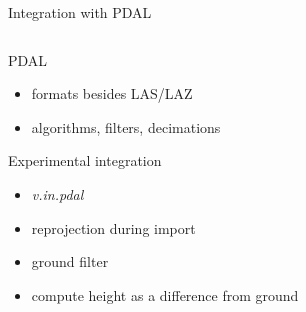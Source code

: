\documentclass[xcolor={dvipsnames,usenames},beamer,aspectratio=169]{beamer}
\newcommand{\module}[1]{\emph{#1}}
\begin{document}
\begin{frame}{Integration with PDAL}

\begin{columns}
\begin{column}{0.5\textwidth}

\begin{block}{PDAL}
 \begin{itemize}
  \item formats besides LAS/LAZ
  \item algorithms, filters, decimations
 \end{itemize}
\end{block}

\begin{block}{Experimental integration}
 \begin{itemize}
  \item \module{v.in.pdal}
  \item reprojection during import
  \item ground filter
  \item compute height as a difference from ground
 \end{itemize}
\end{block}

\end{column}
\begin{column}{0.25\textwidth}


\end{column}
\end{columns}
\end{frame}
\end{document}
